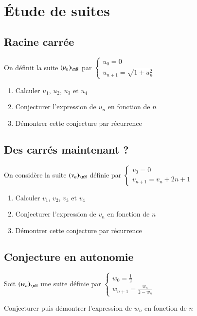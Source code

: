 \documentclass[oneside,12pt]{article}          %
\begin{document}
\section{Étude de suites}


\subsection{Racine carrée}
On définit la suite $(u_n)_{\nN}$ par $\begin{cases}u_0=0\\u_{n+1}=\sqrt{1+u_n^2}\end{cases}$ 
\begin{enumerate}
    \item Calculer $u_1$, $u_2$, $u_3$ et $u_4$
    \item Conjecturer l'expression de $u_n$ en fonction de $n$
    \item Démontrer cette conjecture par récurrence
\end{enumerate}



\subsection{Des carrés maintenant ?}

On considère la suite $(v_n)_{\nN}$ définie par $\begin{cases}v_0=0\\v_{n+1}=v_n+2n+1\end{cases}$
\begin{enumerate}
    \item Calculer $v_1$, $v_2$, $v_3$ et $v_4$
    \item Conjecturer l'expression de $v_n$ en fonction de $n$
    \item Démontrer cette conjecture par récurrence
\end{enumerate}



\subsection{Conjecture en autonomie}
Soit $(w_n)_{\nN}$ une suite définie par $\begin{cases}w_0=\frac{1}{2}\\w_{n+1}=\frac{w_n}{2-w_n}\end{cases}$

Conjecturer puis démontrer l'expression de $w_n$ en fonction de $n$
\end{document}
